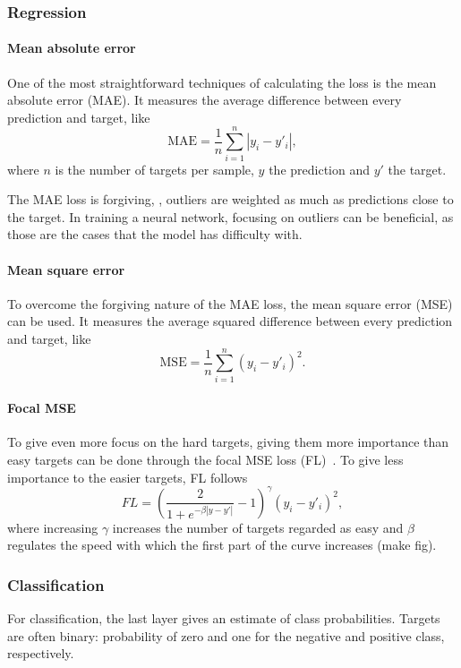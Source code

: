 \subsubsection{Regression}

\paragraph{Mean absolute error}
One of the most straightforward techniques of calculating the loss is the mean absolute error (MAE).
It measures the average difference between every prediction and target, like
\begin{equation}
    \mathrm{MAE} = \frac{1}{n} \sum_{i=1}^{n} |y_i - y'_i|,
\end{equation}
where $n$ is the number of targets per sample, $y$ the prediction and $y'$ the target.

The MAE loss is forgiving, \ie, outliers are weighted as much as predictions close to the target.
In training a neural network, focusing on outliers can be beneficial, as those are the cases that the model has difficulty with.

\paragraph{Mean square error}
To overcome the forgiving nature of the MAE loss, the mean square error (MSE) can be used.
It measures the average squared difference between every prediction and target, like
\begin{equation}
    \mathrm{MSE} = \frac{1}{n} \sum_{i=1}^n (y_i - y'_i)^2.
\end{equation}

\paragraph{Focal MSE}
To give even more focus on the hard targets, giving them more importance than easy targets can be done through the focal MSE loss (FL)~.
To give less importance to the easier targets, FL follows
\begin{equation}
    FL = \left(\frac{2}{1 + e^{-\beta |y - y'|}} - 1 \right)^\gamma (y_i - y'_i)^2,
\end{equation}
where increasing $\gamma$ increases the number of targets regarded as easy and $\beta$ regulates the speed with which the first part of the curve increases (make fig).

\subsubsection{Classification}
For classification, the last layer gives an estimate of class probabilities.
Targets are often binary: probability of zero and one for the negative and positive class, respectively.

